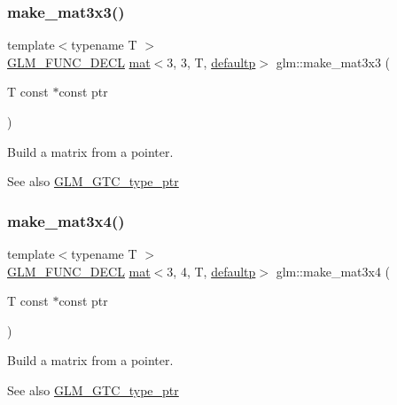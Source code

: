 \subsubsection{\texorpdfstring{make\+\_\+mat3x3()}{make\_mat3x3()}}
{\footnotesize\ttfamily template$<$typename T $>$ \\
\mbox{\hyperlink{setup_8hpp_ab2d052de21a70539923e9bcbf6e83a51}{G\+L\+M\+\_\+\+F\+U\+N\+C\+\_\+\+D\+E\+CL}} \mbox{\hyperlink{structglm_1_1mat}{mat}}$<$3, 3, T, \mbox{\hyperlink{namespaceglm_a36ed105b07c7746804d7fdc7cc90ff25a9d21ccd8b5a009ec7eb7677befc3bf51}{defaultp}}$>$ glm\+::make\+\_\+mat3x3 (\begin{DoxyParamCaption}\item[{T const $\ast$const}]{ptr }\end{DoxyParamCaption})}

Build a matrix from a pointer. \begin{DoxySeeAlso}{See also}
\mbox{\hyperlink{group__gtc__type__ptr}{G\+L\+M\+\_\+\+G\+T\+C\+\_\+type\+\_\+ptr}} 
\end{DoxySeeAlso}
\mbox{\label{group__gtc__type__ptr_ga05dd66232aedb993e3b8e7b35eaf932b}} 
\subsubsection{\texorpdfstring{make\+\_\+mat3x4()}{make\_mat3x4()}}
{\footnotesize\ttfamily template$<$typename T $>$ \\
\mbox{\hyperlink{setup_8hpp_ab2d052de21a70539923e9bcbf6e83a51}{G\+L\+M\+\_\+\+F\+U\+N\+C\+\_\+\+D\+E\+CL}} \mbox{\hyperlink{structglm_1_1mat}{mat}}$<$3, 4, T, \mbox{\hyperlink{namespaceglm_a36ed105b07c7746804d7fdc7cc90ff25a9d21ccd8b5a009ec7eb7677befc3bf51}{defaultp}}$>$ glm\+::make\+\_\+mat3x4 (\begin{DoxyParamCaption}\item[{T const $\ast$const}]{ptr }\end{DoxyParamCaption})}

Build a matrix from a pointer. \begin{DoxySeeAlso}{See also}
\mbox{\hyperlink{group__gtc__type__ptr}{G\+L\+M\+\_\+\+G\+T\+C\+\_\+type\+\_\+ptr}} 
\end{DoxySeeAlso}
\mbox{\label{group__gtc__type__ptr_gae7bcedb710d1446c87fd1fc93ed8ee9a}} 
